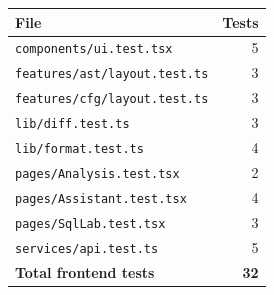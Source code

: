 \begin{tabular}{@{}lr@{}}\toprule
\textbf{File} & \textbf{Tests}\\ \midrule
\texttt{components/ui.test.tsx} & 5\\
\texttt{features/ast/layout.test.ts} & 3\\
\texttt{features/cfg/layout.test.ts} & 3\\
\texttt{lib/diff.test.ts} & 3\\
\texttt{lib/format.test.ts} & 4\\
\texttt{pages/Analysis.test.tsx} & 2\\
\texttt{pages/Assistant.test.tsx} & 4\\
\texttt{pages/SqlLab.test.tsx} & 3\\
\texttt{services/api.test.ts} & 5\\
\midrule
\textbf{Total frontend tests} & \textbf{32}\\ \bottomrule
\end{tabular}
